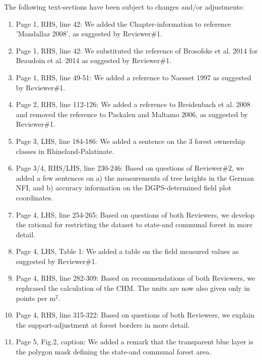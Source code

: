 \documentclass{article}
\begin{document}
The following text-sections have been subject to changes and/or adjustments:

\begin{enumerate}
	
	\item Page 1, RHS, line 42: We added the Chapter-information to reference 'Mandallaz 2008', as suggested by Reviewer\#1.
	
	\item Page 1, RHS, line 42: We substituted the reference of Brosofske et al. 2014 for Beaudoin et al. 2014 as suggested by Reviewer\#1.
	
	\item Page 1, RHS, line 49-51: We added a reference to Naesset 1997 as suggested by Reviewer\#1.
	
	\item Page 2, RHS, line 112-126: We added a reference to Breidenbach et al. 2008 and removed the reference to Packalen and Maltamo 2006, as suggested by Reviewer\#1.
		
	\item Page 3, LHS, line 184-186: We added a sentence on the 3 forest ownership classes in Rhineland-Palatinate.
	
	\item Page 3/4, RHS/LHS, line 230-246: Based on questions of Reviewer\#2, we added a few sentences on a) the measurements of tree heights in the German NFI, and b) accuracy information on the DGPS-determined field plot coordinates.
	
	\item Page 4, LHS, line 254-265: Based on questions of both Reviewers, we develop the rational for restricting the dataset to state-and communal forest in more detail.
	
	\item Page 4, LHS, Table 1: We added a table on the field measured values as suggested by Reviewer\#1.
	
	\item Page 4, RHS, line 282-309: Based on recommendations of both Reviewers, we rephrased the calculation of the CHM. The units are now also given only in points per m$^2$. 
	
	\item Page 4, RHS, line 315-322: Based on questions of both Reviewers, we explain the support-adjustment at forest borders in more detail.
	
	\item Page 5, Fig.2, caption: We added a remark that the transparent blue layer is the polygon mask defining the state-and communal forest area.
	

\end{enumerate}
\end{document}
